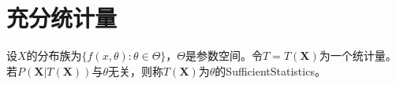 \section{充分统计量}

\begin{definition}
	设$X$的分布族为$\{f(x,\theta):\theta\in\Theta\}$，$\Theta$是参数空间。令$T=T(\mathbf{X})$为一个统计量。若$P(\mathbf{X}|T(\mathbf{X}))$与$\theta$无关，则称$T(\mathbf{X})$为$\theta$的\gls{SufficientStatistics}。
\end{definition}
